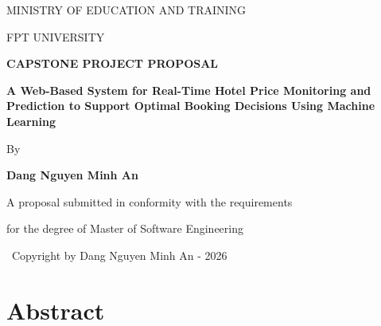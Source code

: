 \documentclass[12pt,a4paper]{report}
\begin{document}
\begin{titlepage}
    \centering
    \vspace*{1cm}
    
    {\large MINISTRY OF EDUCATION AND TRAINING\par}
    {\large FPT UNIVERSITY\par}
    \vspace{2cm}
    
    {\Large\bfseries CAPSTONE PROJECT PROPOSAL\par}
    \vspace{1cm}
    
    {\LARGE\bfseries A Web-Based System for Real-Time Hotel Price Monitoring and Prediction to Support Optimal Booking Decisions Using Machine Learning\par}
    \vspace{1.5cm}
    
    {\Large By\par}
    \vspace{0.8cm}
    
    {\large\bfseries Dang Nguyen Minh An\par}
    \vspace{2cm}
    
    {\large A proposal submitted in conformity with the requirements\par}
    {\large for the degree of Master of Software Engineering\par}
    \vspace{2cm}
    
    {\large \textcopyright\ Copyright by Dang Nguyen Minh An - 2026\par}
    
\end{titlepage}

\chapter*{Abstract}
\end{document}
